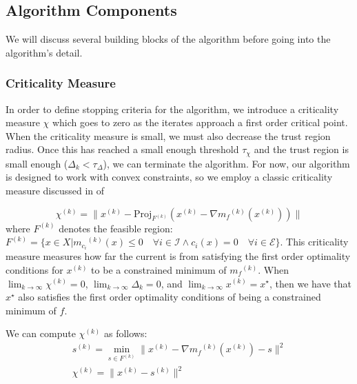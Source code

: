 \documentclass{article}
\theoremstyle{case}
\newcommand{\modelk}{{{m}_f}^{(k)}}
\newcommand{\modelconstrainti}{{{m}_{c_i}}^{(k)}}
\newcommand{\iteratek}{{x}^{(k)}}
\newcommand{\trialk}{{{s}^{(k)}}}
\newcommand{\feasiblek}{{F}^{(k)}}
\newcommand{\chik}{{\chi^{(k)}}}
\begin{document}
\subsection{Algorithm Components}


We will discuss several building blocks of the algorithm before going into the algorithm's detail.

\subsubsection{Criticality Measure}

In order to define stopping criteria for the algorithm, we introduce a criticality measure $\chi$ which goes to zero as the iterates approach a first order critical point.
When the criticality measure is small, we must also decrease the trust region radius.
Once this has reached a small enough threshold $\tau_{\chi}$ and the trust region is small enough ($\Delta_k < \tau_{\Delta}$), we can terminate the algorithm.
For now, our algorithm is designed to work with convex constraints, so we employ a classic criticality measure discussed in \cite{ConnGoulToin00} of

\[
\chik = \|\iteratek - \text{Proj}_{\feasiblek}(\iteratek- \nabla \modelk(\iteratek))\|
\]
where $\feasiblek$ denotes the feasible region: $\feasiblek = \{x \in X | \modelconstrainti(x) \le 0 \quad \forall i \in \mathcal I \wedge c_i(x) = 0 \quad \forall i \in \mathcal E \}$.
This criticality measure measures how far the current is from satisfying the first order optimality conditions for $\iteratek$ to be a constrained minimum of $\modelk$.
When $ \lim_{k\to\infty} \chik = 0$, $\lim_{k\to\infty}\Delta_k = 0$, and $\lim_{k\to\infty}\iteratek = x^{\star}$, then we have that $x^{\star}$ also satisfies the first order optimality conditions of being a constrained minimum of $f$.


We can compute $\chik$ as follows:
\begin{align}
\label{critical}
\trialk = \min_{s \in \feasiblek} \|\iteratek - \nabla \modelk(\iteratek) - s\|^2 \\
\chik = \|\iteratek - \trialk \|^2
\end{align}



\end{document}

